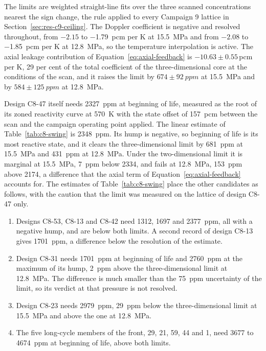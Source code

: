 The limits are weighted straight-line fits over the three scanned
concentrations nearest the sign change, the rule applied to every
Campaign 9 lattice in Section~\ref{sec:res-c9-ceiling}. The Doppler coefficient is negative and resolved throughout,
from $-2.15$ to \SI{-1.79}{pcm} per K at \SI{15.5}{MPa} and from
$-2.08$ to \SI{-1.85}{pcm} per K at \SI{12.8}{MPa}, so the temperature
interpolation is active. The axial leakage contribution of
Equation~\eqref{eq:axial-feedback} is $-10.63 \pm 0.55$\,pcm per K, 29
per cent of the total coefficient of the three-dimensional core at the
conditions of the scan, and it raises the limit by $674 \pm \SI{92}{ppm}$
at \SI{15.5}{MPa} and by $584 \pm \SI{125}{ppm}$ at \SI{12.8}{MPa}.

Design C8-47 itself needs \SI{2327}{ppm} at beginning of life, measured
as the root of its zoned reactivity curve at \SI{570}{K} with the
state offset of \SI{157}{pcm} between the scan and the campaign
operating point applied. The linear estimate of
Table~\ref{tab:c8-swing} is \SI{2348}{ppm}. Its hump is negative, so
beginning of life is its most reactive state, and it clears the
three-dimensional limit by \SI{681}{ppm} at \SI{15.5}{MPa} and
\SI{431}{ppm} at \SI{12.8}{MPa}. Under the two-dimensional limit it is
marginal at \SI{15.5}{MPa}, \SI{7}{ppm} below 2334, and fails at
\SI{12.8}{MPa}, \SI{153}{ppm} above 2174, a difference that the axial
term of Equation~\eqref{eq:axial-feedback} accounts for. The estimates of Table~\ref{tab:c8-swing} place the
other candidates as follows, with the caution that the limit was
measured on the lattice of design C8-47 only.

\begin{enumerate}
  \item Designs C8-53, C8-13 and C8-42 need 1312, 1697 and \SI{2377}{ppm}, all
        with a negative hump, and are below both limits. A second
        record of design C8-13 gives \SI{1701}{ppm}, a difference below
        the resolution of the estimate.

  \item Design C8-31 needs \SI{1701}{ppm} at beginning of life and
        \SI{2760}{ppm} at the maximum of its hump, \SI{2}{ppm} above the
        three-dimensional limit at \SI{12.8}{MPa}. The difference is
        much smaller than the \SI{75}{ppm} uncertainty of the limit, so its
        verdict at that pressure is not resolved.

  \item Design C8-23 needs \SI{2979}{ppm}, \SI{29}{ppm} below the
        three-dimensional limit at \SI{15.5}{MPa} and above the one at
        \SI{12.8}{MPa}.

  \item The five long-cycle members of the front, 29, 21, 59, 44 and 1,
        need 3677 to \SI{4674}{ppm} at beginning of life, above both
        limits.
\end{enumerate}

